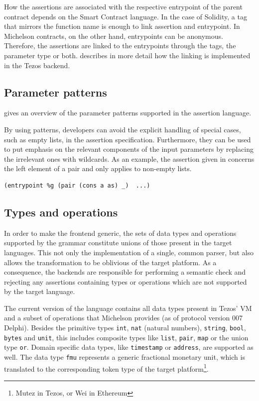 How the assertions are associated with the respective entrypoint of the parent contract depends on the Smart Contract language. In the case of Solidity, a tag that mirrors the function name is enough to link assertion and entrypoint. In Michelson contracts, on the other hand, entrypoints can be anonymous. Therefore, the assertions are linked to the entrypoints through the tags, the parameter type or both.  describes in more detail how the linking is implemented in the Tezos backend.

\subsection{Parameter patterns}
 gives an overview of the parameter patterns supported in the assertion language.


By using patterns, developers can avoid the explicit handling of special cases, such as empty lists, in the assertion specification. Furthermore, they can be used to put emphasis on the relevant components of the input parameters by replacing the irrelevant ones with wildcards. As an example, the assertion given in  concerns the left element of a pair and only applies to non-empty lists. 
\begin{lstlisting}[label=lst:patterns_usage, language=Assertion, numbers=none]
(entrypoint %g (pair (cons a as) _)  ...)
\end{lstlisting}

\subsection{Types and operations}
In order to make the frontend generic, the sets of data types and operations supported by the grammar constitute unions of those present in the target languages. This not only the implementation of a single, common parser, but also allows the transformation to be oblivious of the target platform. As a consequence, the backends are responsible for performing a semantic check and  rejecting any assertions containing types or operations which are not supported by the target language.

The current version of the language contains all data types present in Tezos' VM and a subset of operations that Michelson provides (as of protocol version 007 Delphi). Besides the primitive types \texttt{int}, \texttt{nat} (natural numbers), \texttt{string}, \texttt{bool}, \texttt{bytes} and \texttt{unit}, this includes composite types like \texttt{list}, \texttt{pair}, \texttt{map} or the union type \texttt{or}. Domain specific data types, like \texttt{timestamp} or \texttt{address}, are supported as well. The data type \texttt{fmu} represents a generic fractional monetary unit, which is translated to the corresponding token type of the target platform\footnote{Mutez in Tezos, or Wei in Ethereum}.

